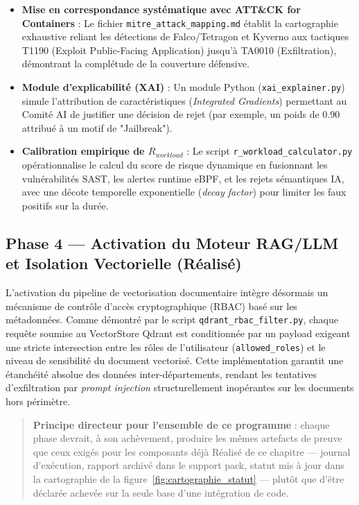\begin{itemize}
    \item \textbf{Mise en correspondance systématique avec ATT\&CK for Containers} : Le fichier \texttt{mitre\_attack\_mapping.md} établit la cartographie exhaustive reliant les détections de Falco/Tetragon et Kyverno aux tactiques T1190 (Exploit Public-Facing Application) jusqu'à TA0010 (Exfiltration), démontrant la complétude de la couverture défensive.
    \item \textbf{Module d'explicabilité (XAI)} : Un module Python (\texttt{xai\_explainer.py}) simule l'attribution de caractéristiques (\textit{Integrated Gradients}) permettant au Comité AI de justifier une décision de rejet (par exemple, un poids de 0.90 attribué à un motif de "Jailbreak").
    \item \textbf{Calibration empirique de $R_{workload}$} : Le script \texttt{r\_workload\_calculator.py} opérationnalise le calcul du score de risque dynamique en fusionnant les vulnérabilités SAST, les alertes runtime eBPF, et les rejets sémantiques IA, avec une décote temporelle exponentielle (\textit{decay factor}) pour limiter les faux positifs sur la durée.
\end{itemize}

\subsection{Phase 4 — Activation du Moteur RAG/LLM et Isolation Vectorielle (Réalisé)}

L'activation du pipeline de vectorisation documentaire intègre désormais un mécanisme de contrôle d'accès cryptographique (RBAC) basé sur les métadonnées. Comme démontré par le script \texttt{qdrant\_rbac\_filter.py}, chaque requête soumise au VectorStore Qdrant est conditionnée par un payload exigeant une stricte intersection entre les rôles de l'utilisateur (\texttt{allowed\_roles}) et le niveau de sensibilité du document vectorisé. Cette implémentation garantit une étanchéité absolue des données inter-départements, rendant les tentatives d'exfiltration par \textit{prompt injection} structurellement inopérantes sur les documents hors périmètre.

\begin{quote}
\textbf{Principe directeur pour l'ensemble de ce programme} : chaque phase devrait, à son achèvement, produire les mêmes artefacts de preuve que ceux exigés pour les composants déjà Réalisé de ce chapitre — journal d'exécution, rapport archivé dans le support pack, statut mis à jour dans la cartographie de la figure~\ref{fig:cartographie_statut} — plutôt que d'être déclarée achevée sur la seule base d'une intégration de code.
\end{quote}

